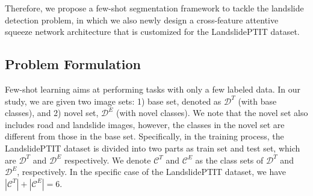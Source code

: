\documentclass{ieeeaccess}
\begin{document}
Therefore, we propose a few-shot segmentation framework to tackle the landslide detection problem, in which we also newly design a cross-feature attentive squeeze network architecture that is customized for the LandslidePTIT dataset.
\subsection{Problem Formulation}

Few-shot learning aims at performing tasks with only a few labeled data. In our study, we are given two image sets: 1) base set, denoted as $\mathcal{D}^T$ (with base classes), and 2) novel set, $\mathcal{D}^E$ (with novel classes). We note that the novel set also includes road and landslide images, however, the classes in the novel set are different from those in the base set. Specifically, in the training process, the LandslidePTIT dataset is divided into two parts as train set and test set, which are $\mathcal{D}^T$ and $\mathcal{D}^E$ respectively. We denote $\mathcal{C}^{T}$ and $\mathcal{C}^{E}$ as the class sets of $\mathcal{D}^T$ and $\mathcal{D}^E$, respectively. In the specific case of the LandslidePTIT dataset, we have $|\mathcal{C}^T| + |\mathcal{C}^E| = 6$.

\end{document}
